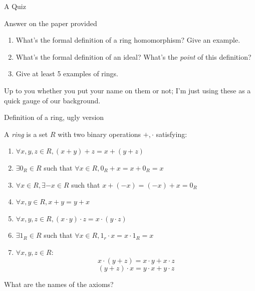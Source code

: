 \documentclass{beamer}
\begin{document}
\begin{frame}[plain,c]

\begin{center}

\Huge

A Quiz
\end{center}

\end{frame}



\begin{frame}{Answer on the paper provided}

\begin{enumerate}
\item What's the formal definition of a ring homomorphism?  Give an example.
\item What's the formal definition of an ideal?  What's the \emph{point} of this definition?
\item Give at least 5 examples of rings.
\end{enumerate}

Up to you whether you put your name on them or not; I'm just using these as a quick gauge of our background.

\end{frame}

\begin{frame}{Definition of a ring, ugly version}

A \emph{ring} is a set $R$ with two binary operations $+, \cdot$ satisfying:

\begin{enumerate}
\item $\forall x, y,z\in R, (x+y)+z=x+(y+z)$
\item $\exists 0_R\in R$ such that $\forall x\in R,  0_R+x=x+0_R=x$
\item $\forall x\in R, \exists {-x}\in R$ such that $x+({-x})=({-x})+x=0_R$
\item $\forall x,y \in R, x+y=y+x$
\item $\forall x, y,z\in R, (x\cdot y)\cdot z=x\cdot (y\cdot z)$
\item $\exists 1_R\in R$ such that $\forall x\in R, 1_r\cdot x=x\cdot 1_R=x$
\item $\forall x, y,z\in R$:
$$x\cdot (y+z)=x\cdot y+x\cdot z$$ 
$$(y+z)\cdot x=y\cdot x+ y\cdot z$$
\end{enumerate}

\begin{block}{What are the names of the axioms?}\end{block}

\end{frame}
\end{document}
